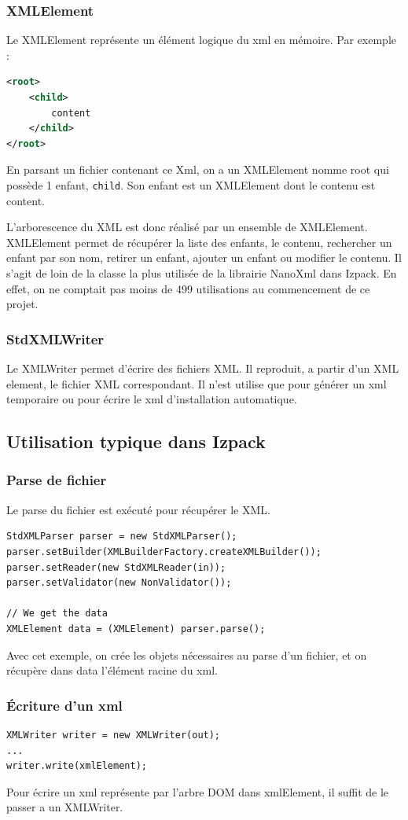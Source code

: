 \subsubsection{XMLElement}
Le XMLElement représente un élément logique du xml en mémoire. Par exemple :
\begin{lstlisting}[language=xml]
<root>
	<child>
		content
	</child>
</root>
\end{lstlisting}
En parsant un fichier contenant ce Xml, on a un XMLElement nomme root qui possède 1 enfant, \verb|child|. Son enfant est un XMLElement dont le contenu est content.

L'arborescence du XML est donc réalisé par un ensemble de XMLElement. XMLElement permet de récupérer la liste des enfants, le contenu, rechercher un enfant par son nom, retirer un enfant, ajouter un enfant ou modifier le contenu. Il s'agit de loin de la classe la plus utilisée de la librairie NanoXml dans Izpack. En effet, on ne comptait pas moins de 499 utilisations au commencement de ce projet.
\subsubsection{StdXMLWriter}
Le XMLWriter permet d'écrire des fichiers XML. Il reproduit, a partir d'un XML element, le fichier XML correspondant. Il n'est utilise que pour générer un xml temporaire ou pour écrire le xml d'installation automatique. 
\subsection{Utilisation typique dans Izpack}
\subsubsection{Parse de fichier}
Le parse du fichier est exécuté pour récupérer le XML.
\begin{lstlisting}
StdXMLParser parser = new StdXMLParser();
parser.setBuilder(XMLBuilderFactory.createXMLBuilder());
parser.setReader(new StdXMLReader(in));
parser.setValidator(new NonValidator());

// We get the data
XMLElement data = (XMLElement) parser.parse();
\end{lstlisting}
Avec cet exemple, on crée les objets nécessaires au parse d'un fichier, et on récupère dans data l'élément racine du xml.

\subsubsection{Écriture d'un xml}
\begin{lstlisting}
XMLWriter writer = new XMLWriter(out);
...
writer.write(xmlElement);
\end{lstlisting}
Pour écrire un xml représente par l'arbre DOM dans xmlElement, il suffit de le passer a un XMLWriter.

